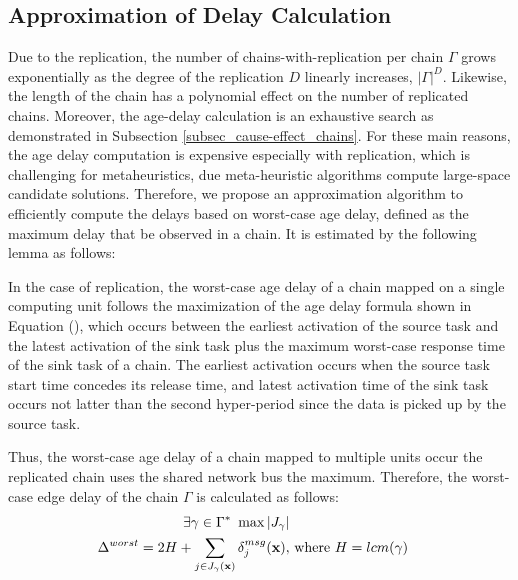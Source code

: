 \subsection{Approximation of Delay Calculation}\label{subsec_approximation_alg}
Due to the replication, the number of chains-with-replication per chain $\Gamma$ grows exponentially as the degree of the replication $D$ linearly increases, $|\Gamma|^D$. Likewise, the length of the chain has a polynomial effect on the number of replicated chains. Moreover, the age-delay calculation is an exhaustive search as demonstrated in Subsection \ref{subsec_cause-effect_chains}. For these main reasons, the age delay computation is expensive especially with replication, which is challenging for metaheuristics, due meta-heuristic algorithms compute large-space candidate solutions. Therefore, we propose an approximation algorithm to efficiently compute the delays based on worst-case age delay, defined as the maximum delay that be observed in a chain. It is estimated by the following lemma as follows:
\begin{lemma} 
	In the case of replication, the worst-case age delay of a chain mapped on a single computing unit follows the maximization of the age delay formula shown in Equation (), which occurs between the earliest activation of the source task and the latest activation of the sink task plus the maximum worst-case response time of the sink task of a chain. The earliest activation occurs when the source task start time concedes its release time, and latest activation time of the sink task occurs not latter than the second hyper-period since the data is picked up by the source task. 
	
	
	Thus, the worst-case age delay of a chain mapped to multiple units occur the replicated chain uses the shared network bus the maximum. Therefore, the worst-case edge delay of the chain $\Gamma$ is calculated as follows:
	\begin{align}
		\exists \gamma\in\Gamma^*\ \max{|J_\gamma|}\\
		\Delta^{worst}=2H+\sum_{j\in J_{\gamma}(\textbf{x})}{\delta^{msg}_j(\textbf{x})}, & \mbox{ where } H=lcm(\gamma)
	\end{align}
\end{lemma}




